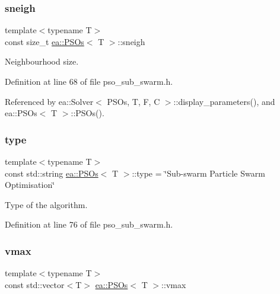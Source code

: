 \mbox{\label{structea_1_1_p_s_os_a60d85bb8fdc3913239c5769906c3f917}} 
\subsubsection{\texorpdfstring{sneigh}{sneigh}}
{\footnotesize\ttfamily template$<$typename T$>$ \\
const size\+\_\+t \hyperlink{structea_1_1_p_s_os}{ea\+::\+P\+S\+Os}$<$ T $>$\+::sneigh}



Neighbourhood size. 



Definition at line 68 of file pso\+\_\+sub\+\_\+swarm.\+h.



Referenced by ea\+::\+Solver$<$ P\+S\+Os, T, F, C $>$\+::display\+\_\+parameters(), and ea\+::\+P\+S\+Os$<$ T $>$\+::\+P\+S\+Os().

\mbox{\label{structea_1_1_p_s_os_a70f9529943125d7f2811961e1d25b30b}} 
\subsubsection{\texorpdfstring{type}{type}}
{\footnotesize\ttfamily template$<$typename T$>$ \\
const std\+::string \hyperlink{structea_1_1_p_s_os}{ea\+::\+P\+S\+Os}$<$ T $>$\+::type = \char`\"{}Sub-\/swarm Particle Swarm Optimisation\char`\"{}}



Type of the algorithm. 



Definition at line 76 of file pso\+\_\+sub\+\_\+swarm.\+h.

\mbox{\label{structea_1_1_p_s_os_a58dfadd4951b668607176b290a18c1fa}} 
\subsubsection{\texorpdfstring{vmax}{vmax}}
{\footnotesize\ttfamily template$<$typename T$>$ \\
const std\+::vector$<$T$>$ \hyperlink{structea_1_1_p_s_os}{ea\+::\+P\+S\+Os}$<$ T $>$\+::vmax}



